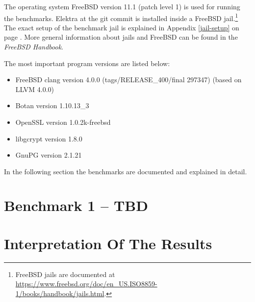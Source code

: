 The operating system FreeBSD version 11.1 (patch level 1) is used for running the benchmarks.
Elektra  at the git commit  is installed inside a FreeBSD jail.\footnote{FreeBSD jails
are documented at \url{https://www.freebsd.org/doc/en_US.ISO8859-1/books/handbook/jails.html}.
}
The exact setup of the benchmark jail is explained in Appendix \ref{jail-setup} on page \pageref{jail-setup}.
More general information about jails and FreeBSD can be found in the \emph{FreeBSD Handbook}.\cite{freebsd-doc}

The most important program versions are listed below:

\begin{itemize}
  \item FreeBSD clang version 4.0.0 (tags/RELEASE\_400/final 297347) (based on LLVM 4.0.0)
  \item Botan version 1.10.13\_3
  \item OpenSSL version 1.0.2k-freebsd
  \item libgcrypt version 1.8.0
  \item GnuPG version 2.1.21
\end{itemize}

In the following section the benchmarks are documented and explained in detail.

\section{Benchmark 1 -- TBD}

\section{Interpretation Of The Results}
